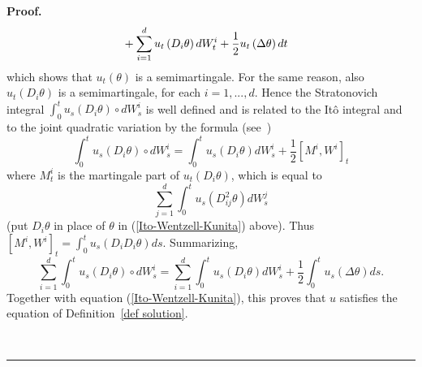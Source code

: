 \documentclass[a4paper,11pt]{article}
\newenvironment{proof}[1][Proof]{\textbf{#1.} }{\ \rule{0.5em}{0.5em}}
\begin{document}
\begin{proof}
\begin{align}
& +\sum_{i=1}^{d}u_{t}\left( D_{i}\theta \right) dW_{t}^{i}+\frac{1}{2}%
u_{t}\left( \Delta \theta \right) dt  \notag
\end{align}
which shows that $u_{t}\left( \theta \right) $ is a semimartingale. For the
same reason, also $u_{t}\left( D_{i}\theta \right) $ is a semimartingale,
for each $i=1,...,d$. Hence the Stratonovich integral $\int_{0}^{t}u_{s}%
\left( D_{i}\theta \right) \circ dW_{s}^{i}$ is well defined and is related
to the It\^{o} integral and to the joint quadratic variation by the formula (see~\cite
{K})
\begin{equation*}
\int_{0}^{t}u_{s}\left( D_{i}\theta \right) \circ
dW_{s}^{i}=\int_{0}^{t}u_{s}\left( D_{i}\theta \right) dW_{s}^{i}+\frac{1}{2}%
\left[ M^{i},W^{i}\right] _{t}
\end{equation*}
where $M_{t}^{i}$ is the martingale part of $u_{t}\left( D_{i}\theta \right)
$, which is equal to
\begin{equation*}
\sum_{j=1}^{d}\int_{0}^{t}u_{s}\left( D^2_{ij}\theta \right) dW_{s}^{j}
\end{equation*}
(put $D_{i}\theta $ in place of $\theta $ in (\ref{Ito-Wentzell-Kunita})
above). Thus $\left[ M^{i},W^{i}\right] _{t}=\int_{0}^{t}u_{s}\left(
D_{i}D_{i}\theta \right) ds$. Summarizing,
\begin{equation*}
\sum_{i=1}^{d}\int_{0}^{t}u_{s}\left( D_{i}\theta \right) \circ
dW_{s}^{i}=\sum_{i=1}^{d}\int_{0}^{t}u_{s}\left( D_{i}\theta \right)
dW_{s}^{i}+\frac{1}{2}\int_{0}^{t}u_{s}\left( \Delta \theta \right) ds.
\end{equation*}
Together with equation (\ref{Ito-Wentzell-Kunita}), this proves that $u$
satisfies the equation of Definition~\ref{def solution}.


\end{proof}
\end{document}
